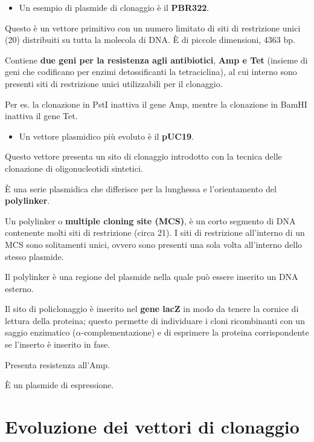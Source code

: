 \documentclass[11pt]{book}
\begin{document}
\begin{itemize}
\itemsep1pt\parskip0pt
\item
  Un esempio di plasmide di clonaggio è il \textbf{PBR322}.
\end{itemize}

Questo è un vettore primitivo con un numero limitato di siti di
restrizione unici (20) distribuiti su tutta la molecola di DNA. È di
piccole dimensioni, 4363 bp.

Contiene \textbf{due geni per la resistenza agli antibiotici},
\textbf{Amp e Tet} (insieme di geni che codificano per enzimi
detossificanti la tetraciclina), al cui interno sono presenti siti di
restrizione unici utilizzabili per il clonaggio.

Per es. la clonazione in PstI inattiva il gene Amp, mentre la clonazione
in BamHI inattiva il gene Tet.

\begin{itemize}
\itemsep1pt\parskip0pt
\item
  Un vettore plasmidico più evoluto è il \textbf{pUC19}.
\end{itemize}

Questo vettore presenta un sito di clonaggio introdotto con la tecnica
delle clonazione di oligonucleotidi sintetici.

È una serie plasmidica che differisce per la lunghessa e l'orientamento
del \textbf{polylinker}.

Un polylinker o \textbf{multiple cloning site (MCS)}, è un corto
segmento di DNA contenente molti siti di restrizione (circa 21). I siti
di restrizione all'interno di un MCS sono solitamenti unici, ovvero sono
presenti una sola volta all'interno dello stesso plasmide.

Il polylinker è una regione del plasmide nella quale può essere inserito
un DNA esterno.

Il sito di policlonaggio è inserito nel \textbf{gene lacZ} in modo da
tenere la cornice di lettura della proteina; questo permette di
individuare i cloni ricombinanti con un saggio enzimatico
(\(\alpha\)-complementazione) e di esprimere la proteina corrispondente
se l'inserto è inserito in fase.

Presenta resistenza all'Amp.

È un plasmide di espressione.

\section{Evoluzione dei vettori di
clonaggio}\label{evoluzione-dei-vettori-di-clonaggio}
\end{document}

